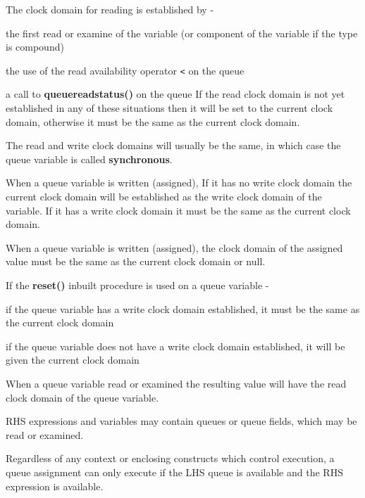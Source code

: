             The clock domain for reading is established by -
            \blist
            \item   the first read or examine of the variable (or component of
                    the variable if the type is compound)
            \item   the use of the read availability operator \verb'<' on the
                    queue
            \item   a call to {\bf queuereadstatus()} on the queue
            \blend
            If the read clock domain is not yet established in any of these
            situations then it will be set to the current clock domain,
            otherwise it must be the same as the current clock domain.

            The read and write clock domains will usually be the same, in which
            case the queue variable is called {\bf synchronous}.

            When a queue variable is written (assigned), If it has no write
            clock domain the current clock domain will be established as the
            write clock domain of the variable. If it has a write clock domain
            it must be the same as the current clock domain.

            When a queue variable is written (assigned), the clock domain of the
            assigned value must be the same as the current clock domain or
            null.

            If the {\bf reset()} inbuilt procedure is used on a queue variable -
            \blist
            \item   if the queue variable has a write clock domain established,
                    it must be the same as the current clock domain
            \item   if the queue variable does not have a write clock domain
                    established, it will be given the current clock domain
            \blend

            When a queue variable read or examined the resulting value will have
            the read clock domain of the queue variable.

            RHS expressions and variables may contain queues or queue fields,
            which may be read or examined.

            Regardless of any context or enclosing constructs which control
            execution, a queue assignment can only execute if the LHS queue is
            available and the RHS expression is available.

